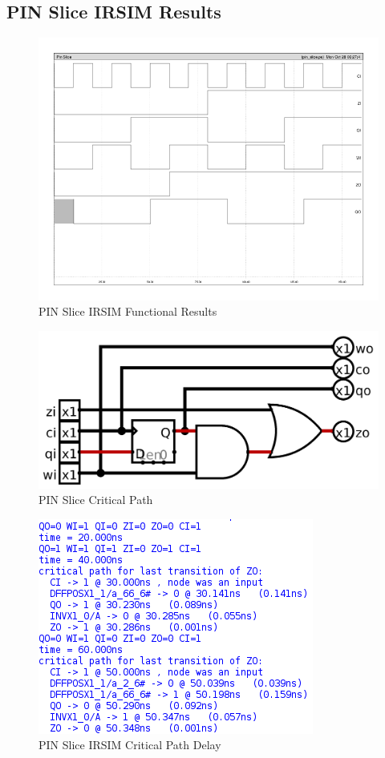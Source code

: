     \subsection{PIN Slice IRSIM Results}
        
        \begin{figure}[H]
            \centering
            \includegraphics[width=0.75\linewidth]{../../irsim/pin_slice.png}
            \caption{PIN Slice IRSIM Functional Results}
        \end{figure}
        \begin{figure}[H]
            \centering
            \includegraphics[width=\linewidth]{../../logisim/pin_slice_crit_path.png}
            \caption{PIN Slice Critical Path}
        \end{figure}
        \begin{figure}[H]
            \centering
            \includegraphics[]{../../irsim/pin_slice_timing.png}
            \caption{PIN Slice IRSIM Critical Path Delay}
        \end{figure}
